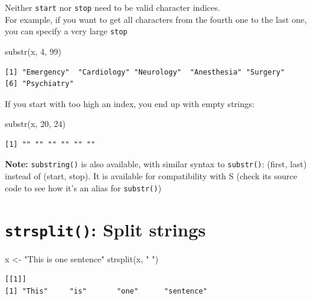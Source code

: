 \documentclass[
]{book}
\newenvironment{Shaded}{\begin{snugshade}}{\end{snugshade}}
\newcommand{\DecValTok}[1]{\textcolor[rgb]{0.00,0.00,0.81}{#1}}
\newcommand{\FunctionTok}[1]{\textcolor[rgb]{0.00,0.00,0.00}{#1}}
\newcommand{\NormalTok}[1]{#1}
\newcommand{\OtherTok}[1]{\textcolor[rgb]{0.56,0.35,0.01}{#1}}
\newcommand{\StringTok}[1]{\textcolor[rgb]{0.31,0.60,0.02}{#1}}
\begin{document}
Neither \texttt{start} nor \texttt{stop} need to be valid character indices.\\
For example, if you want to get all characters from the fourth one to the last one, you can specify a very large \texttt{stop}

\begin{Shaded}
\begin{Highlighting}[]
\FunctionTok{substr}\NormalTok{(x, }\DecValTok{4}\NormalTok{, }\DecValTok{99}\NormalTok{)}
\end{Highlighting}
\end{Shaded}

\begin{verbatim}
[1] "Emergency"  "Cardiology" "Neurology"  "Anesthesia" "Surgery"   
[6] "Psychiatry"
\end{verbatim}

If you start with too high an index, you end up with empty strings:

\begin{Shaded}
\begin{Highlighting}[]
\FunctionTok{substr}\NormalTok{(x, }\DecValTok{20}\NormalTok{, }\DecValTok{24}\NormalTok{)}
\end{Highlighting}
\end{Shaded}

\begin{verbatim}
[1] "" "" "" "" "" ""
\end{verbatim}

\textbf{Note:} \texttt{substring()} is also available, with similar syntax to \texttt{substr()}: (first, last) instead of (start, stop). It is available for compatibility with S (check its source code to see how it's an alias for \texttt{substr()})

\hypertarget{strsplit-split-strings}{%
\section{\texorpdfstring{\texttt{strsplit()}: Split strings}{strsplit(): Split strings}}\label{strsplit-split-strings}}

\begin{Shaded}
\begin{Highlighting}[]
\NormalTok{x }\OtherTok{\textless{}{-}} \StringTok{"This is one sentence"}
\FunctionTok{strsplit}\NormalTok{(x, }\StringTok{" "}\NormalTok{)}
\end{Highlighting}
\end{Shaded}

\begin{verbatim}
[[1]]
[1] "This"     "is"       "one"      "sentence"
\end{verbatim}
\end{document}
